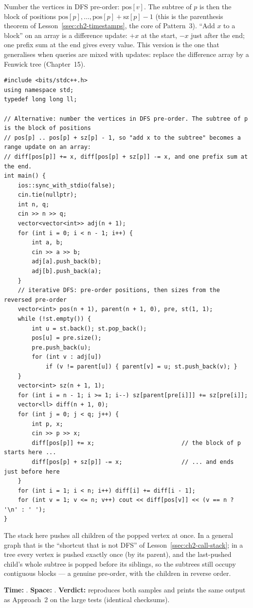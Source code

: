\begin{alternativebox}
Number the vertices in DFS pre-order: $\mathrm{pos}[v]$. The subtree of $p$ is then the block of positions $\mathrm{pos}[p], \dots, \mathrm{pos}[p] + \mathrm{sz}[p] - 1$ (this is the parenthesis theorem of Lesson~\ref{ssec:ch2-timestamps}, the core of Pattern~3). ``Add $x$ to a block'' on an array is a difference update: $+x$ at the start, $-x$ just after the end; one prefix sum at the end gives every value. This version is the one that generalises when queries are mixed with updates: replace the difference array by a Fenwick tree (Chapter~15).

\begin{lstlisting}[style=cpp]
#include <bits/stdc++.h>
using namespace std;
typedef long long ll;

// Alternative: number the vertices in DFS pre-order. The subtree of p is the block of positions
// pos[p] .. pos[p] + sz[p] - 1, so "add x to the subtree" becomes a range update on an array:
// diff[pos[p]] += x, diff[pos[p] + sz[p]] -= x, and one prefix sum at the end.
int main() {
    ios::sync_with_stdio(false);
    cin.tie(nullptr);
    int n, q;
    cin >> n >> q;
    vector<vector<int>> adj(n + 1);
    for (int i = 0; i < n - 1; i++) {
        int a, b;
        cin >> a >> b;
        adj[a].push_back(b);
        adj[b].push_back(a);
    }
    // iterative DFS: pre-order positions, then sizes from the reversed pre-order
    vector<int> pos(n + 1), parent(n + 1, 0), pre, st(1, 1);
    while (!st.empty()) {
        int u = st.back(); st.pop_back();
        pos[u] = pre.size();
        pre.push_back(u);
        for (int v : adj[u])
            if (v != parent[u]) { parent[v] = u; st.push_back(v); }
    }
    vector<int> sz(n + 1, 1);
    for (int i = n - 1; i >= 1; i--) sz[parent[pre[i]]] += sz[pre[i]];
    vector<ll> diff(n + 1, 0);
    for (int j = 0; j < q; j++) {
        int p, x;
        cin >> p >> x;
        diff[pos[p]] += x;                         // the block of p starts here ...
        diff[pos[p] + sz[p]] -= x;                 // ... and ends just before here
    }
    for (int i = 1; i < n; i++) diff[i] += diff[i - 1];
    for (int v = 1; v <= n; v++) cout << diff[pos[v]] << (v == n ? '\n' : ' ');
}
\end{lstlisting}
The stack here pushes all children of the popped vertex at once. In a general graph that is the ``shortcut that is not DFS'' of Lesson~\ref{ssec:ch2-call-stack}; in a tree every vertex is pushed exactly once (by its parent), and the last-pushed child's whole subtree is popped before its siblings, so the subtrees still occupy contiguous blocks --- a genuine pre-order, with the children in reverse order.
\begin{complexitybox}
\textbf{Time:} . \textbf{Space:} . \textbf{Verdict:} reproduces both samples and prints the same output as Approach~2 on the large tests (identical checksums).
\end{complexitybox}
\end{alternativebox}

